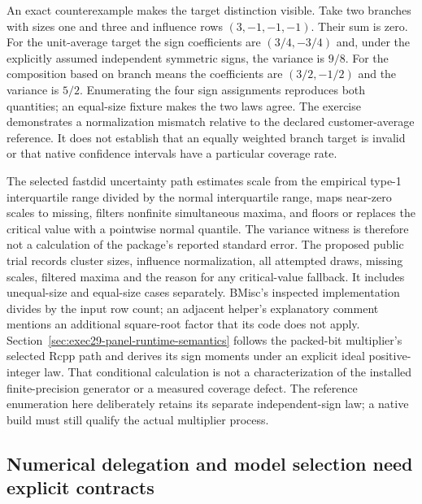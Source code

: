 An exact counterexample makes the target distinction visible. Take two branches with sizes one and three and influence rows $(3,-1,-1,-1)$. Their sum is zero. For the unit-average target the sign coefficients are $(3/4,-3/4)$ and, under the explicitly assumed independent symmetric signs, the variance is $9/8$. For the composition based on branch means the coefficients are $(3/2,-1/2)$ and the variance is $5/2$. Enumerating the four sign assignments reproduces both quantities; an equal-size fixture makes the two laws agree. The exercise demonstrates a normalization mismatch relative to the declared customer-average reference. It does not establish that an equally weighted branch target is invalid or that native confidence intervals have a particular coverage rate.~\citep{exec29_panel_inference_reference}

The selected fastdid uncertainty path estimates scale from the empirical type-1 interquartile range divided by the normal interquartile range, maps near-zero scales to missing, filters nonfinite simultaneous maxima, and floors or replaces the critical value with a pointwise normal quantile. The variance witness is therefore not a calculation of the package's reported standard error. The proposed public trial records cluster sizes, influence normalization, all attempted draws, missing scales, filtered maxima and the reason for any critical-value fallback. It includes unequal-size and equal-size cases separately. BMisc's inspected implementation divides by the input row count; an adjacent helper's explanatory comment mentions an additional square-root factor that its code does not apply. Section~\ref{sec:exec29-panel-runtime-semantics} follows the packed-bit multiplier's selected Rcpp path and derives its sign moments under an explicit ideal positive-integer law. That conditional calculation is not a characterization of the installed finite-precision generator or a measured coverage defect. The reference enumeration here deliberately retains its separate independent-sign law; a native build must still qualify the actual multiplier process.~\citep{exec28_panel_delegates,exec29_panel_inference_sources,exec29_panel_inference_reference}

\subsection{Numerical delegation and model selection need explicit contracts}

